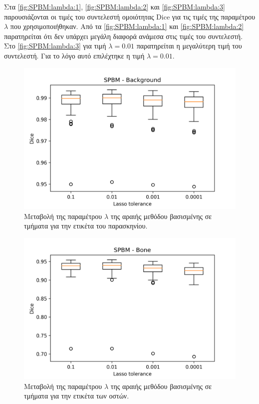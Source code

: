 \documentclass[a4paper,12pt]{article}
\begin{document}
Στα \autoref{fig:SPBM:lambda:1}, \autoref{fig:SPBM:lambda:2} και
\autoref{fig:SPBM:lambda:3} παρουσιάζονται οι τιμές του συντελεστή ομοιότητας
Dice για τις τιμές της παραμέτρου $\lambda$ που χρησιμοποιήθηκαν. Από τα
\autoref{fig:SPBM:lambda:1} και \autoref{fig:SPBM:lambda:2} παρατηρείται ότι
δεν υπάρχει μεγάλη διαφορά ανάμεσα στις τιμές του συντελεστή. Στο
\autoref{fig:SPBM:lambda:3} για τιμή $\lambda = 0.01$ παρατηρείται η μεγαλύτερη
τιμή του συντελεστή. Για το λόγο αυτό επιλέχτηκε η τιμή $\lambda = 0.01$.

\begin{figure}[H]
    \centering
    \includegraphics[width=0.85\linewidth]{SPBM_Lasso_tolerance_Background_plot.png}
    \caption{Μεταβολή της παραμέτρου $\lambda$ της αραιής μεθόδου βασισμένης σε
             τμήματα για την ετικέτα του παρασκηνίου.}
    \label{fig:SPBM:lambda:1}
\end{figure}

\begin{figure}[H]
    \centering
    \includegraphics[width=0.85\linewidth]{SPBM_Lasso_tolerance_Bone_plot.png}
    \caption{Μεταβολή της παραμέτρου $\lambda$ της αραιής μεθόδου βασισμένης σε
             τμήματα για την ετικέτα των οστών.}
    \label{fig:SPBM:lambda:2}
\end{figure}
\end{document}
